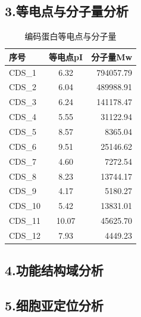 \documentclass[supercite]{HustGraduPaper}
\begin{document}
	\subsection{3.等电点与分子量分析}
	\begin{table}[H]
  \begin{center}
    \caption{编码蛋白等电点与分子量}
    \begin{tabular}{l|c|r} %
      \textbf{序号} & \textbf{等电点pI} & \textbf{分子量Mw}\\
      \hline
			  CDS\_1 & 6.32 & 794057.79\\
        CDS\_2 & 6.04 & 489988.91\\
        CDS\_3 & 6.24 & 141178.47\\
        CDS\_4 & 5.55 & 31122.94\\
        CDS\_5 & 8.57 & 8365.04\\
        CDS\_6 & 9.51 & 25146.62\\
        CDS\_7 & 4.60 & 7272.54\\
  	    CDS\_8 & 8.23 & 13744.17\\
  	    CDS\_9 & 4.17 & 5180.27\\
  	    CDS\_10 & 5.42 & 13831.01\\
  	    CDS\_11 & 10.07 & 45625.70\\
  	    CDS\_12 & 7.93 & 4449.23\\
    \end{tabular}
  \end{center}
\end{table}
	\subsection{4.功能结构域分析}

	\subsection{5.细胞亚定位分析}
\end{document}
